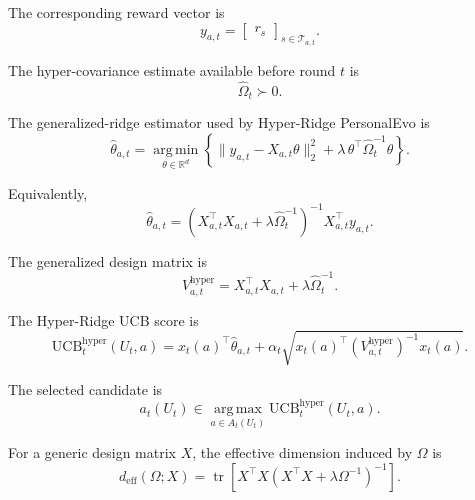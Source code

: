 \documentclass{article} %
\begin{document}
The corresponding reward vector is
\begin{equation}
\label{eq:hyper-response}
y_{a,t}=
\begin{bmatrix}
r_s
\end{bmatrix}_{s\in\mathcal{T}_{a,t}} .
\end{equation}

The hyper-covariance estimate available before round \(t\) is
\begin{equation}
\label{eq:hyper-omega-hat}
\widehat{\Omega}_t \succ 0 .
\end{equation}

The generalized-ridge estimator used by Hyper-Ridge PersonalEvo is
\begin{equation}
\label{eq:hyper-estimator-argmin}
\widehat{\theta}_{a,t}
=
\operatorname*{arg\,min}_{\theta\in\mathbb{R}^d}
\left\{
\|y_{a,t}-X_{a,t}\theta\|_2^2
+
\lambda\,\theta^\top\widehat{\Omega}_t^{-1}\theta
\right\}.
\end{equation}

Equivalently,
\begin{equation}
\label{eq:hyper-estimator-closed}
\widehat{\theta}_{a,t}
=
\left(
X_{a,t}^\top X_{a,t}
+
\lambda \widehat{\Omega}_t^{-1}
\right)^{-1}
X_{a,t}^\top y_{a,t}.
\end{equation}

The generalized design matrix is
\begin{equation}
\label{eq:hyper-vhat}
V_{a,t}^{\mathrm{hyper}}
=
X_{a,t}^\top X_{a,t}
+
\lambda\widehat{\Omega}_t^{-1}.
\end{equation}

The Hyper-Ridge UCB score is
\begin{equation}
\label{eq:hyper-ucb-app}
\mathrm{UCB}_{t}^{\mathrm{hyper}}(U_t,a)
=
x_t(a)^\top \widehat{\theta}_{a,t}
+
\alpha_t
\sqrt{
x_t(a)^\top
\left(V_{a,t}^{\mathrm{hyper}}\right)^{-1}
x_t(a)
}.
\end{equation}

The selected candidate is
\begin{equation}
\label{eq:hyper-action}
a_t(U_t)
\in
\operatorname*{arg\,max}_{a\in A_t(U_t)}
\mathrm{UCB}_{t}^{\mathrm{hyper}}(U_t,a).
\end{equation}

For a generic design matrix \(X\), the effective dimension induced by \(\Omega\) is
\begin{equation}
\label{eq:hyper-deff-app}
d_{\mathrm{eff}}(\Omega;X)
=
\operatorname{tr}
\!\left[
X^\top X
\left(
X^\top X+\lambda\Omega^{-1}
\right)^{-1}
\right].
\end{equation}
\end{document}
